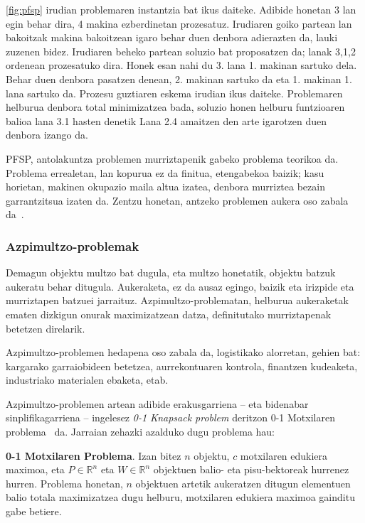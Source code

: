 \documentclass[eu]{ifirak}\usepackage[]{graphicx}\usepackage[]{color}
\begin{document}
\ref{fig:pfsp} irudian problemaren instantzia bat ikus daiteke. Adibide honetan 3 lan egin behar dira, 4 makina ezberdinetan prozesatuz. Irudiaren goiko partean lan bakoitzak makina bakoitzean igaro behar duen denbora adierazten da, lauki zuzenen bidez. Irudiaren beheko partean soluzio bat proposatzen da; lanak 3,1,2 ordenean prozesatuko dira. Honek esan nahi du 3. lana 1. makinan sartuko dela. Behar duen denbora pasatzen denean, 2. makinan sartuko da eta 1. makinan 1. lana sartuko da. Prozesu guztiaren eskema irudian ikus daiteke. Problemaren helburua denbora total minimizatzea bada, soluzio honen helburu funtzioaren balioa lana 3.1 hasten denetik Lana 2.4 amaitzen den arte igarotzen duen denbora izango da.


PFSP, antolakuntza problemen murriztapenik gabeko problema teorikoa da. Problema errealetan, lan kopurua ez da finitua, etengabekoa baizik; kasu horietan, makinen okupazio maila altua izatea, denbora murriztea bezain garrantzitsua izaten da. Zentzu honetan, antzeko problemen aukera oso zabala da~\cite{taillard1993}.

\subsubsection{Azpimultzo-problemak}\label{sec:subset_problems}

Demagun objektu multzo bat dugula, eta multzo honetatik, objektu batzuk aukeratu behar ditugula. Aukeraketa, ez da ausaz egingo, baizik eta irizpide eta murriztapen batzuei jarraituz. Azpimultzo-problematan, helburua aukeraketak ematen dizkigun onurak maximizatzean datza, definitutako murriztapenak betetzen direlarik.

Azpimultzo-problemen hedapena oso zabala da, logistikako alorretan, gehien bat: kargarako garraiobideen betetzea, aurrekontuaren kontrola, finantzen kudeaketa, industriako materialen ebaketa, etab.

Azpimultzo-problemen artean adibide erakusgarriena -- eta bidenabar sinplifikagarriena -- ingelesez \textit{0-1 Knapsack problem} deritzon 0-1 Motxilaren problema~\cite{kellerer2004} da. Jarraian zehazki azalduko dugu problema hau:

\begin{ifdefinition} {\bf 0-1 Motxilaren Problema}. Izan bitez $n$ objektu, $c$ motxilaren edukiera maximoa, eta $P\in\mathbb{R}^n$ eta $W\in\mathbb{R}^n$ objektuen balio- eta pisu-bektoreak hurrenez hurren. Problema honetan, $n$ objektuen artetik aukeratzen ditugun elementuen balio totala maximizatzea dugu helburu, motxilaren edukiera maximoa gainditu gabe betiere. 
\end{ifdefinition}
\end{document}
